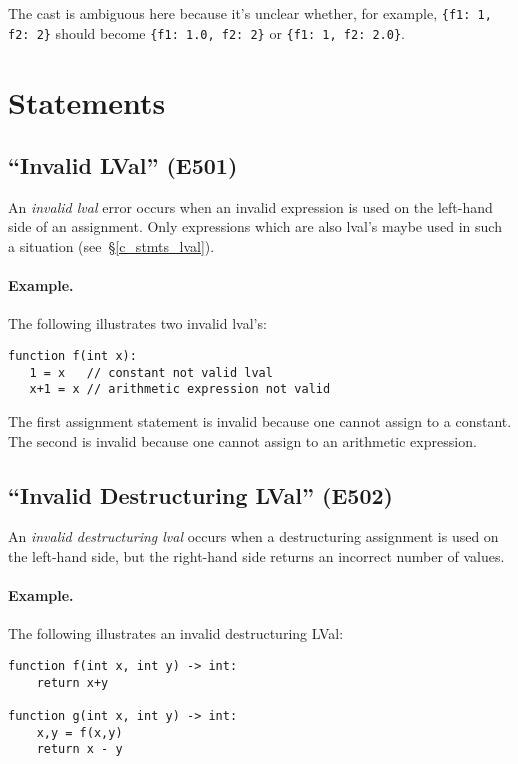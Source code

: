 The cast is ambiguous here because it's unclear whether, for example, \lstinline|{f1: 1, f2: 2}| should become \lstinline|{f1: 1.0, f2: 2}| or \lstinline|{f1: 1, f2: 2.0}|.


\section{Statements}

\subsection{``Invalid LVal'' (E501)}

An {\em invalid lval} error occurs when an invalid expression is used on the left-hand side of an assignment.  Only expressions which are also lval's maybe used in such a situation  (see~\S\ref{c_stmts_lval}).

\paragraph{Example.}  The following illustrates two invalid lval's:

\begin{lstlisting}
function f(int x):
   1 = x   // constant not valid lval
   x+1 = x // arithmetic expression not valid    
\end{lstlisting}

The first assignment statement is invalid because one cannot assign to a constant.  The second is invalid because one cannot assign to an arithmetic expression.

\subsection{``Invalid Destructuring LVal'' (E502)}

An {\em invalid destructuring lval} occurs when a destructuring assignment is used on the left-hand side, but the right-hand side returns an incorrect number of values.

\paragraph{Example.}  The following illustrates an invalid destructuring LVal:

\begin{lstlisting}
function f(int x, int y) -> int:
    return x+y

function g(int x, int y) -> int:
    x,y = f(x,y)
    return x - y
\end{lstlisting}

